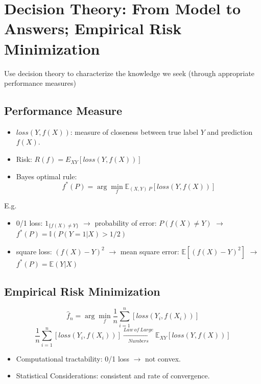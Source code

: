 \documentclass[letterpaper, 10pt, twocolumn]{article}
\begin{document}
\newpage

\section{Decision Theory: From Model to Answers; Empirical Risk Minimization}

Use decision theory to characterize the knowledge we seek (through appropriate performance measures)

\subsection{Performance Measure}

\begin{itemize}
	\item $loss(Y,f(X))$: measure of closeness between true label $Y$ and prediction $f(X)$.
	\item Risk: $R(f)=E_{XY}[loss(Y,f(X))]$
	\item Bayes optimal rule: $$f^*(P) = \arg\min_f\mathbb{E}_{(X,Y)~P}[loss(Y,f(X))]$$
\end{itemize}

E.g.
\begin{itemize}
	\item 0/1 loss: $1_{\{f(X)\neq Y\}}$ $\rightarrow$ probability of error: $P(f(X) \neq Y)$ $\rightarrow$ $f^*(P)=\mathbb{I}(P(Y=1|X)>1/2)$
	\item square loss: $(f(X)-Y)^2$ $\rightarrow$ mean square error: $\mathbb{E}[(f(X)-Y)^2]$ $\rightarrow$ $f^*(P)=\mathbb{E}(Y|X)$
\end{itemize}

\subsection{Empirical Risk Minimization}

$$\hat{f}_n = \arg\min_f \frac{1}{n}\sum_{i=1}^{n}[loss(Y_i,f(X_i))]$$
$$\frac{1}{n}\sum_{i=1}^{n}[loss(Y_i,f(X_i))] \xrightarrow[Numbers]{Law~of~Large} \mathbb{E}_{XY}[loss(Y,f(X))]$$

\begin{itemize}
	\item Computational tractability: 0/1 loss $\rightarrow$ not convex.
	\item Statistical Considerations: consistent and rate of convergence.
\end{itemize}
\end{document}
